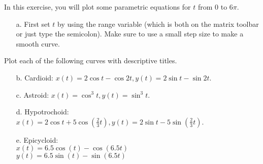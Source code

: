 {In this exercise, you will plot some parametric equations for $t$ from 0 to $6\pi$. 
\begin{enumerate}
\item[a.] First set $t$ by using the range variable (which is both on the matrix toolbar or just type the semicolon).
Make sure to use a small step size to make a smooth curve.
\end{enumerate}

Plot each of the following curves with descriptive titles.

\begin{enumerate}
\item[b.] Cardioid: $x(t) = 2 \cos t - \cos 2t, y(t) = 2\sin t - \sin 2t$.
\item[c.] Astroid: $x(t) = \cos^3 t, y(t) = \sin^3 t$.
\item[d.] Hypotrochoid:\\ 
$x(t) = 2 \cos t + 5\cos\left(\frac{2}{3}t\right), y(t) = 2\sin t - 5\sin\left(\frac{2}{3}t\right)$.
\item[e.] Epicycloid:\\ 
$x(t)=6.5 \cos(t)-\cos(6.5 t)$\\
$y(t)=6.5 \sin(t)-\sin(6.5 t)$ 
\end{enumerate}
}
{}
